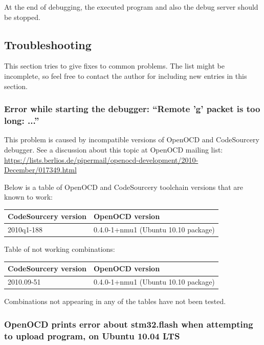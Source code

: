 \documentclass[a4paper, 10pt]{article}
\begin{document}
At the end of debugging, the executed program and also the
debug server should be stopped.

\subsection{Troubleshooting}

This section tries to give fixes to common problems.
The list might be incomplete, so feel free to contact the author for including
new entries in this section.

\subsubsection{Error while starting the debugger: ``Remote 'g' packet is too long: ...''}

\label{sect:gdb-problems}
This problem is caused by incompatible versions of OpenOCD and CodeSourcery debugger.
See a discussion about this topic at OpenOCD mailing list:
\url{https://lists.berlios.de/pipermail/openocd-development/2010-December/017349.html}

Below is a table of OpenOCD and CodeSourcery toolchain versions that are known to work:

    \smallskip
    \begin{tabular}{ l | l }
    CodeSourcery version & OpenOCD version \\
    \hline
    2010q1-188          &   0.4.0-1+nmu1 (Ubuntu 10.10 package) \\
    \end{tabular}
    \smallskip

Table of not working combinations:

    \smallskip
    \begin{tabular}{ l | l }
    CodeSourcery version & OpenOCD version \\
    \hline
    2010.09-51          &   0.4.0-1+nmu1 (Ubuntu 10.10 package) \\
    \end{tabular}
    \smallskip

Combinations not appearing in any of the tables have not been tested.

\subsubsection{OpenOCD prints error about stm32.flash
    when attempting to upload program,
    on Ubuntu 10.04 LTS}
\end{document}
